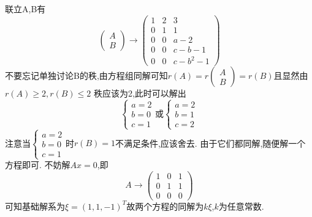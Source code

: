 \documentclass[12pt, a4paper, oneside, UTF8]{ctexbook}
\begin{document}
\begin{enumerate}
    \begin{solution}
    联立A,B有 
    $$
    \begin{pmatrix}
        A \\
        B
    \end{pmatrix} \rightarrow \begin{pmatrix}
        1 & 2 & 3 \\
        0 & 1 & 1 \\
        0 & 0 & a-2 \\
        \hline 
        0 & 0 & c-b-1 \\
        0 & 0 & c-b^2-1  
    \end{pmatrix}
    $$
    {\color{red}不要忘记单独讨论B的秩},由方程组同解可知$r(A)=r\begin{pmatrix}
        A \\
        B 
    \end{pmatrix} = r(B)$且显然由$r(A)\geq 2, r(B)\leq 2$ 秩应该为2,此时可以解出 
    $$
    \begin{cases}
        a = 2 \\
        b = 0 \\
        c = 1
    \end{cases} \text{或} \begin{cases}
        a = 2 \\
        b = 1 \\
        c = 2
    \end{cases}
    $$ 注意当$\begin{cases}
        a = 2 \\
        b = 0 \\
        c = 1
    \end{cases}$时$r(B)=1$不满足条件,应该舍去. 由于它们都同解,随便解一个方程即可. 不妨解$Ax=0$,即
    $$
    A\rightarrow \begin{pmatrix}
        1 & 0 & 1 \\
        0 & 1 & 1 \\
        0 & 0 & 0
    \end{pmatrix}
    $$ 可知基础解系为$\xi=(1,1,-1)^T$故两个方程的同解为$k\xi$,$k$为任意常数.
    \end{solution}
\end{enumerate}

\ifx\allfiles\undefined
\end{document}
